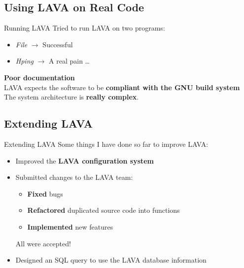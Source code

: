 \documentclass[aspectratio=169]{beamer}
\begin{document}
  \subsection{Using LAVA on Real Code}

  \begin{frame}{Running LAVA}
    Tried to run LAVA on two programs:
    \begin{itemize}
    \item \textit{File} $\rightarrow$ \textcolor{custom-green}{Successful}
    \item \textit{Hping} $\rightarrow$ \textcolor{custom-red}{A real pain \ldots}
    \end{itemize}
    \pause
    \vspace{0.5em}
    \textbf{Poor documentation} \\
    \vspace{0.3em}
    LAVA expects the software to be \textbf{compliant with the GNU build system} \\
    \vspace{0.3em}
    The system architecture is \textbf{really complex}.
  \end{frame}

  \subsection{Extending LAVA}

  \begin{frame}{Extending LAVA}
    Some things I have done so far to improve LAVA:
    \begin{itemize}
    \setlength\itemsep{1em}
    \item Improved the \textbf{LAVA configuration system}
    \item Submitted changes to the LAVA team:
      \begin{itemize}
        \item \textbf{Fixed} bugs
        \item \textbf{Refactored} duplicated source code into functions
        \item \textbf{Implemented} new features
      \end{itemize}
      All were \textcolor{custom-green}{accepted}!
    \item Designed an SQL query to \alert{use the LAVA database information}
    \end{itemize}
  \end{frame}
\end{document}
